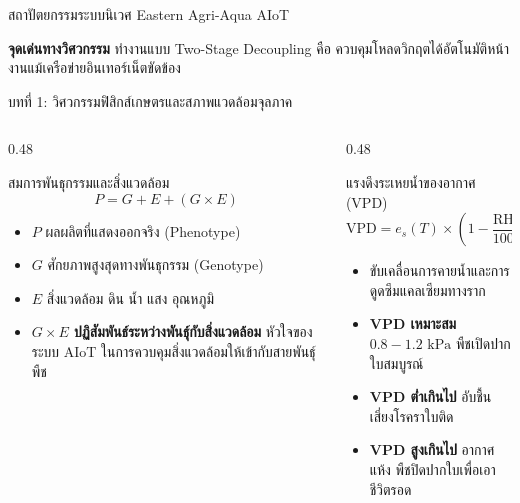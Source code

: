 \documentclass[aspectratio=169, 10pt]{beamer}
\begin{document}
\begin{frame}{สถาปัตยกรรมระบบนิเวศ Eastern Agri-Aqua AIoT}
\vspace{0.1cm}
\begin{notecard}
    {\bfseries\color{rbruNavy} จุดเด่นทางวิศวกรรม} ทำงานแบบ Two-Stage Decoupling คือ ควบคุมโหลดวิกฤตได้อัตโนมัติหน้างานแม้เครือข่ายอินเทอร์เน็ตขัดข้อง
\end{notecard}
\end{frame}

\begin{frame}{บทที่ 1: วิศวกรรมฟิสิกส์เกษตรและสภาพแวดล้อมจุลภาค}
\begin{columns}[T]
    \begin{column}{0.48\textwidth}
        \begin{mastercard}{สมการพันธุกรรมและสิ่งแวดล้อม}
            \begin{equation*}
                P = G + E + (G \times E)
            \end{equation*}
            \begin{itemize}
                \item $P$ ผลผลิตที่แสดงออกจริง (Phenotype)
                \item $G$ ศักยภาพสูงสุดทางพันธุกรรม (Genotype)
                \item $E$ สิ่งแวดล้อม ดิน น้ำ แสง อุณหภูมิ
                \item \textbf{$G \times E$ ปฏิสัมพันธ์ระหว่างพันธุ์กับสิ่งแวดล้อม} หัวใจของระบบ AIoT ในการควบคุมสิ่งแวดล้อมให้เข้ากับสายพันธุ์พืช
            \end{itemize}
        \end{mastercard}
    \end{column}
    \begin{column}{0.48\textwidth}
        \begin{goldcard}{แรงดึงระเหยน้ำของอากาศ (VPD)}
            \begin{equation*}
                \text{VPD} = e_s(T) \times \left(1 - \frac{\text{RH}}{100}\right)
            \end{equation*}
            \begin{itemize}
                \item ขับเคลื่อนการคายน้ำและการดูดซึมแคลเซียมทางราก
                \item \textbf{VPD เหมาะสม} $0.8 - 1.2\text{ kPa}$ พืชเปิดปากใบสมบูรณ์
                \item \textbf{VPD ต่ำเกินไป} อับชื้น เสี่ยงโรคราใบติด
                \item \textbf{VPD สูงเกินไป} อากาศแห้ง พืชปิดปากใบเพื่อเอาชีวิตรอด
            \end{itemize}
        \end{goldcard}
    \end{column}
\end{columns}
\end{frame}
\end{document}
